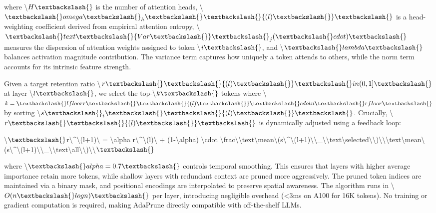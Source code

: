\documentclass[11pt,a4paper]{article}
\begin{document}
where \textbackslash{}$H\textbackslash{}$ is the number of attention heads, \textbackslash{}$\textbackslash{}omega\textbackslash{}_h\textbackslash{}^{}\textbackslash{}{(l)\textbackslash{}}\textbackslash{}$ is a head-weighting coefficient derived from empirical attention entropy, \textbackslash{}$\textbackslash{}text\textbackslash{}{Var\textbackslash{}}\textbackslash{}_j(\textbackslash{}cdot)\textbackslash{}$ measures the dispersion of attention weights assigned to token \textbackslash{}$i\textbackslash{}$, and \textbackslash{}$\textbackslash{}lambda\textbackslash{}$ balances activation magnitude contribution. The variance term captures how uniquely a token attends to others, while the norm term accounts for its intrinsic feature strength.

Given a target retention ratio \textbackslash{}$r\textbackslash{}^{}\textbackslash{}{(l)\textbackslash{}} \textbackslash{}in (0,1]\textbackslash{}$ at layer \textbackslash{}$l\textbackslash{}$, we select the top-\textbackslash{}$k\textbackslash{}$ tokens where \textbackslash{}$k = \textbackslash{}lfloor r\textbackslash{}^{}\textbackslash{}{(l)\textbackslash{}} \textbackslash{}cdot n \textbackslash{}rfloor\textbackslash{}$ by sorting \textbackslash{}$s\textbackslash{}_i\textbackslash{}^{}\textbackslash{}{(l)\textbackslash{}}\textbackslash{}$. Crucially, \textbackslash{}$r\textbackslash{}^{}\textbackslash{}{(l)\textbackslash{}}\textbackslash{}$ is dynamically adjusted using a feedback loop:

\textbackslash{}$\textbackslash{}$r\textbackslash{}^{}\textbackslash{}{(l+1)\textbackslash{}} = \textbackslash{}alpha r\textbackslash{}^{}\textbackslash{}{(l)\textbackslash{}} + (1-\textbackslash{}alpha) \textbackslash{}cdot \textbackslash{}frac\textbackslash{}{\textbackslash{}text\textbackslash{}{mean\textbackslash{}}(s\textbackslash{}^{}\textbackslash{}{(l+1)\textbackslash{}}\textbackslash{}_\textbackslash{}{\textbackslash{}text\textbackslash{}{selected\textbackslash{}}\textbackslash{}})\textbackslash{}}\textbackslash{}{\textbackslash{}text\textbackslash{}{mean\textbackslash{}}(s\textbackslash{}^{}\textbackslash{}{(l+1)\textbackslash{}}\textbackslash{}_\textbackslash{}{\textbackslash{}text\textbackslash{}{all\textbackslash{}}\textbackslash{}})\textbackslash{}}\textbackslash{}$\textbackslash{}$

where \textbackslash{}$\textbackslash{}alpha=0.7\textbackslash{}$ controls temporal smoothing. This ensures that layers with higher average importance retain more tokens, while shallow layers with redundant context are pruned more aggressively. The pruned token indices are maintained via a binary mask, and positional encodings are interpolated to preserve spatial awareness. The algorithm runs in \textbackslash{}$O(n \textbackslash{}log n)\textbackslash{}$ per layer, introducing negligible overhead (<3ms on A100 for 16K tokens). No training or gradient computation is required, making AdaPrune directly compatible with off-the-shelf LLMs.
\end{document}
